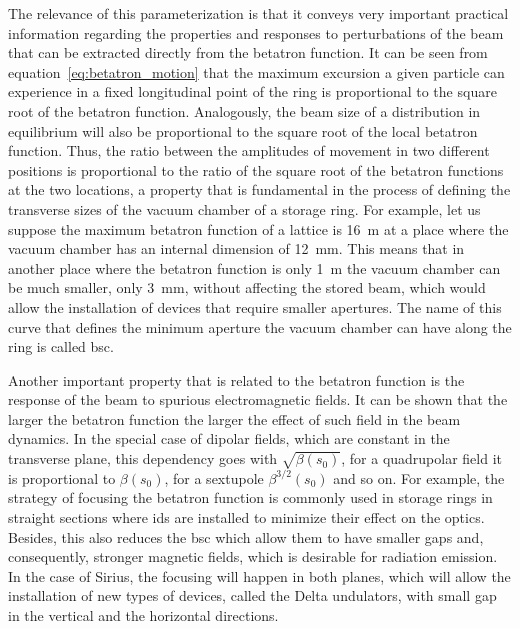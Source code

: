 	The relevance of this parameterization is that it conveys very important practical information regarding the properties and responses to perturbations of the beam that can be extracted directly from the betatron function. It can be seen from equation~\eqref{eq:betatron_motion} that the maximum excursion a given particle can experience in a fixed longitudinal point of the ring is proportional to the square root of the betatron function. Analogously, the beam size of a distribution in equilibrium will also be proportional to the square root of the local betatron function. Thus, the ratio between the amplitudes of movement in two different positions is proportional to the ratio of the square root of the betatron functions at the two locations, a property that is fundamental in the process of defining the transverse sizes of the vacuum chamber of a storage ring. For example, let us suppose the maximum betatron function of a lattice is \SI{16}{\meter} at a place where the vacuum chamber has an internal dimension of \SI{12}{\milli\meter}. This means that in another place where the betatron function is only \SI{1}{\meter} the vacuum chamber can be much smaller, only \SI{3}{\milli\meter}, without affecting the stored beam, which would allow the installation of devices that require smaller apertures. The name of this curve that defines the minimum aperture the vacuum chamber can have along the ring is called \gls{bsc}.

	Another important property that is related to the betatron function is the response of the beam to spurious electromagnetic fields. It can be shown that the larger the betatron function the larger the effect of such field in the beam dynamics. In the special case of dipolar fields, which are constant in the transverse plane, this dependency goes with $\sqrt{\beta(s_0)}$, for a quadrupolar field it is proportional to $\beta(s_0)$, for a sextupole $\beta^{3/2}(s_0)$ and so on. For example, the strategy of focusing the betatron function is commonly used in storage rings in straight sections where \glspl{id} are installed to minimize their effect on the optics. Besides, this also reduces the \gls{bsc} which allow them to have smaller gaps and, consequently, stronger magnetic fields, which is desirable for radiation emission. In the case of Sirius, the focusing will happen in both planes, which will allow the installation of new types of devices, called the Delta undulators, with small gap in the vertical and the horizontal directions.

